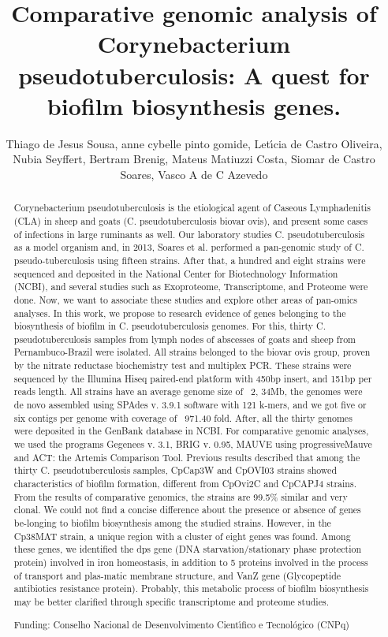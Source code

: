 \documentclass[twoside]{article}
\title{\vspace{-15mm}\fontsize{24pt}{10pt}\selectfont\textbf{ Comparative genomic analysis of Corynebacterium pseudotuberculosis: A quest for biofilm biosynthesis genes. }} %
\author{ Thiago de Jesus Sousa, anne cybelle pinto gomide, Let\'{\i}cia de Castro Oliveira, Nubia Seyffert, Bertram Brenig, Mateus Matiuzzi Costa, Siomar de Castro Soares, Vasco A de C Azevedo }
\affil{ University G\"ottingen }
\date{}
\begin{document}
  
  
  \maketitle %
  
  
  \thispagestyle{fancy} %
  
  
  \begin{abstract}
  Corynebacterium pseudotuberculosis is the etiological agent of Caseous Lymphadenitis (CLA) in sheep and goats (C. pseudotuberculosis biovar ovis),  and present some cases of infections in large ruminants as well. Our laboratory studies C. pseudotuberculosis as a model organism and,  in 2013,  Soares et al. performed a pan-genomic study of C. pseudo-tuberculosis using fifteen strains. After that,  a hundred and eight strains were sequenced and deposited in the National Center for Biotechnology Information (NCBI),  and several studies such as Exoproteome,  Transcriptome,  and Proteome were done. Now,  we want to associate these studies and explore other areas of pan-omics analyses. In this work,  we propose to research evidence of genes belonging to the biosynthesis of biofilm in C. pseudotuberculosis genomes. For this,  thirty C. pseudotuberculosis samples from lymph nodes of abscesses of goats and sheep from Pernambuco-Brazil were isolated. All strains belonged to the biovar ovis group,  proven by the nitrate reductase biochemistry test and multiplex PCR. These strains were sequenced by the Illumina Hiseq paired-end platform with 450bp insert,  and 151bp per reads length. All strains have an average genome size of ~2, 34Mb,  the genomes were de novo assembled using SPAdes v. 3.9.1 software with 121 k-mers,  and we got five or six contigs per genome with coverage of ~971.40 fold. After,  all the thirty genomes were deposited in the GenBank database in NCBI. For comparative genomic analyses,  we used the programs Gegenees v. 3.1,  BRIG v. 0.95,  MAUVE using progressiveMauve and ACT: the Artemis Comparison Tool. Previous results described that among the thirty C. pseudotuberculosis samples,  CpCap3W and CpOVI03 strains showed characteristics of biofilm formation,  different from CpOvi2C and CpCAPJ4 strains. From the results of comparative genomics,  the strains are 99.5\% similar and very clonal. We could not find a concise difference about the presence or absence of genes be-longing to biofilm biosynthesis among the studied strains. However,  in the Cp38MAT strain,  a unique region with a cluster of eight genes was found. Among these genes,  we identified the dps gene (DNA starvation/stationary phase protection protein) involved in iron homeostasis,  in addition to 5 proteins involved in the process of transport and plas-matic membrane structure,  and VanZ gene (Glycopeptide antibiotics resistance protein). Probably,  this metabolic process of biofilm biosynthesis may be better clarified through specific transcriptome and proteome studies.
  
  Funding: Conselho Nacional de Desenvolvimento Cient\'{\i}fico e Tecnol\'ogico (CNPq) \\ 
  \end{abstract}
  
\end{document}
